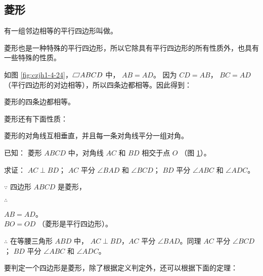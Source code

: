 \subsection{菱形}\label{subsec:czjh1-4-6}

有一组邻边相等的平行四边形叫做。

菱形也是一种特殊的平行四边形，所以它除具有平行四边形的所有性质外，也具有一些特殊的性质。

如图 \ref{fig:czjh1-4-24}，$\pxsbx ABCD$ 中， $AB = AD$。 因为 $CD = AB$，
$BC = AD$（平行四边形的对边相等），所以四条边都相等。因此得到：


\begin{dingli}[菱形性质定理1]
    菱形的四条边都相等。
\end{dingli}

\begin{figure}[htbp]
    \centering
    \begin{minipage}[b]{7cm}
        \centering
        
        \caption{}\label{fig:czjh1-4-24}
    \end{minipage}
    \qquad
    \begin{minipage}[b]{7cm}
        \centering
        
        \caption{}\label{fig:czjh1-4-25}
    \end{minipage}
\end{figure}

菱形还有下面性质：

\begin{dingli}[菱形性质定理2]
    菱形的对角线互相垂直，并且每一条对角线平分一组对角。
\end{dingli}

已知： 菱形 $ABCD$ 中，对角线 $AC$ 和 $BD$ 相交于点 $O$ （图 \ref{fig:czjh1-4-25}）。

求证： $AC \perp BD$；
$AC$ 平分 $\angle BAD$ 和 $\angle BCD$；
$BD$ 平分 $\angle ABC$ 和 $\angle ADC$。

\zhengming $\because$ \quad 四边形 $ABCD$ 是菱形，

$\therefore$ \quad \begin{zmtblr}[t]{}
    $AB = AD$。 \\
    $BO = OD$ （菱形是平行四边形）。
\end{zmtblr}

$\therefore$ \quad 在等腰三角形 $ABD$ 中，
$AC \perp BD$，$AC$ 平分 $\angle BAD$。同理
$AC$ 平分 $\angle BCD$； $BD$ 平分 $\angle ABC$ 和 $\angle ADC$。

要判定一个四边形是菱形，除了根据定义判定外，还可以根据下面的定理：

